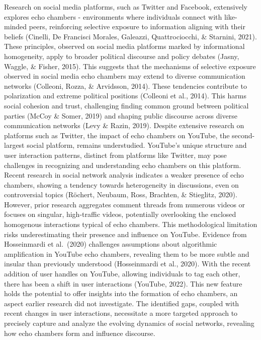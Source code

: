 \documentclass[
  man,floatsintext]{apa6}
\begin{document}
Research on social media platforms, such as Twitter and Facebook, extensively explores echo chambers - environments where individuals connect with like-minded peers, reinforcing selective exposure to information aligning with their beliefs (Cinelli, De Francisci Morales, Galeazzi, Quattrociocchi, \& Starnini, 2021). These principles, observed on social media platforms marked by informational homogeneity, apply to broader political discourse and policy debates (Jasny, Waggle, \& Fisher, 2015). This suggests that the mechanisms of selective exposure observed in social media echo chambers may extend to diverse communication networks (Colleoni, Rozza, \& Arvidsson, 2014). These tendencies contribute to polarization and extreme political positions (Colleoni et al., 2014). This harms social cohesion and trust, challenging finding common ground between political parties (McCoy \& Somer, 2019) and shaping public discourse across diverse communication networks (Levy \& Razin, 2019). Despite extensive research on platforms such as Twitter, the impact of echo chambers on YouTube, the second-largest social platform, remains understudied. YouTube's unique structure and user interaction patterns, distinct from platforms like Twitter, may pose challenges in recognizing and understanding echo chambers on this platform.
Recent research in social network analysis indicates a weaker presence of echo chambers, showing a tendency towards heterogeneity in discussions, even on controversial topics (Röchert, Neubaum, Ross, Brachten, \& Stieglitz, 2020). However, prior research aggregates comment threads from numerous videos or focuses on singular, high-traffic videos, potentially overlooking the enclosed homogenous interactions typical of echo chambers. This methodological limitation risks underestimating their presence and influence on YouTube. Evidence from Hosseinmardi et al.~(2020) challenges assumptions about algorithmic amplification in YouTube echo chambers, revealing them to be more subtle and insular than previously understood (Hosseinmardi et al., 2020). With the recent addition of user handles on YouTube, allowing individuals to tag each other, there has been a shift in user interactions (YouTube, 2022). This new feature holds the potential to offer insights into the formation of echo chambers, an aspect earlier research did not investigate. The identified gaps, coupled with recent changes in user interactions, necessitate a more targeted approach to precisely capture and analyze the evolving dynamics of social networks, revealing how echo chambers form and influence discourse.
\end{document}
